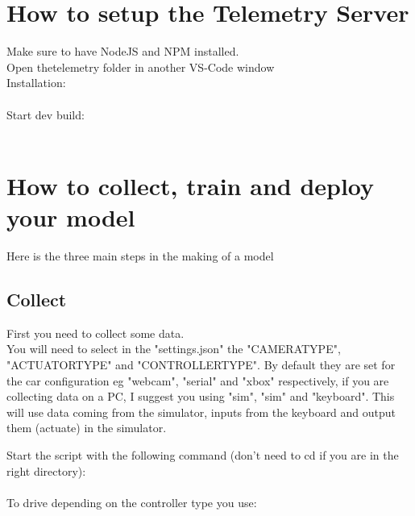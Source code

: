 \documentclass[12pt]{article}
\begin{document}
\section{How to setup the Telemetry Server}
Make sure to have NodeJS and NPM installed.\\
Open thetelemetry folder in another VS-Code window\\

Installation:\\

\noindent{}\\

Start dev build:\\

\noindent{}\\

\section{How to collect, train and deploy your model}
Here is the three main steps in the making of a model\\

\subsection{Collect}
First you need to collect some data.\\

You will need to select in the "settings.json" the "CAMERA\textunderscore TYPE", "ACTUATOR\textunderscore TYPE" and "CONTROLLER\textunderscore TYPE". By default they are set for the car configuration eg "webcam", "serial" and "xbox" respectively, if you are collecting data on a PC, I suggest you using "sim", "sim" and "keyboard". This will use data coming from the simulator, inputs from the keyboard and output them (actuate) in the simulator.


Start the script with the following command (don't need to cd if you are in the right directory):\\

\noindent{}\\

To drive depending on the controller type you use:\\
\end{document}

